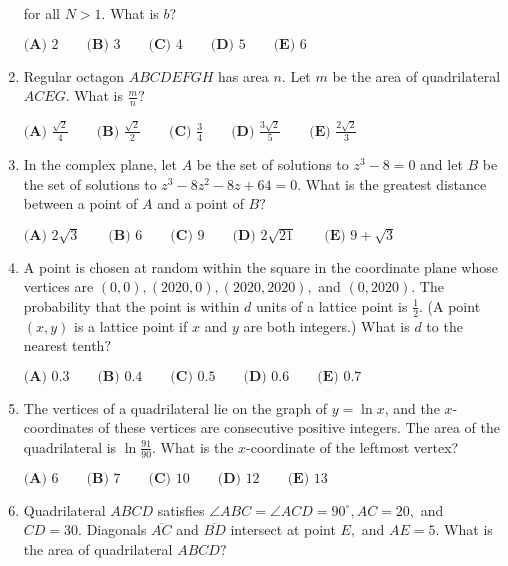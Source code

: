 \documentclass{article}%
\begin{document}
\begin{enumerate}
for all $N > 1$. What is $b$?

$\textbf{(A) } 2 \qquad \textbf{(B) } 3 \qquad \textbf{(C) } 4 \qquad \textbf{(D) } 5 \qquad \textbf{(E) } 6$

%
\item%
[\textbf{Problem 14}]Regular octagon $ABCDEFGH$ has area $n$. Let $m$ be the area of quadrilateral $ACEG$. What is $\frac{m}{n}?$

$\textbf{(A) } \frac{\sqrt{2}}{4} \qquad \textbf{(B) } \frac{\sqrt{2}}{2} \qquad \textbf{(C) } \frac{3}{4} \qquad \textbf{(D) } \frac{3\sqrt{2}}{5} \qquad \textbf{(E) } \frac{2\sqrt{2}}{3}$

%
\item%
[\textbf{Problem 15}]In the complex plane, let $A$ be the set of solutions to $z^{3}-8=0$ and let $B$ be the set of solutions to $z^{3}-8z^{2}-8z+64=0.$ What is the greatest distance between a point of $A$ and a point of $B?$

$\textbf{(A) } 2\sqrt{3} \qquad \textbf{(B) } 6 \qquad \textbf{(C) } 9 \qquad \textbf{(D) } 2\sqrt{21} \qquad \textbf{(E) } 9+\sqrt{3}$

%
\item%
[\textbf{Problem 16}]A point is chosen at random within the square in the coordinate plane whose vertices are $(0, 0), (2020, 0), (2020, 2020),$ and $(0, 2020)$. The probability that the point is within $d$ units of a lattice point is $\frac{1}{2}$. (A point $(x, y)$ is a lattice point if $x$ and $y$ are both integers.) What is $d$ to the nearest tenth$?$

$\textbf{(A) } 0.3 \qquad \textbf{(B) } 0.4 \qquad \textbf{(C) } 0.5 \qquad \textbf{(D) } 0.6 \qquad \textbf{(E) } 0.7$

%
\item%
[\textbf{Problem 17}]The vertices of a quadrilateral lie on the graph of $y=\ln{x}$, and the $x$-coordinates of these vertices are consecutive positive integers. The area of the quadrilateral is $\ln{\frac{91}{90}}$. What is the $x$-coordinate of the leftmost vertex?

$\textbf{(A) } 6 \qquad \textbf{(B) } 7 \qquad \textbf{(C) } 10 \qquad \textbf{(D) } 12 \qquad \textbf{(E) } 13$

%
\item%
[\textbf{Problem 18}]Quadrilateral $ABCD$ satisfies $\angle ABC = \angle ACD = 90^{\circ}, AC=20,$ and $CD=30.$ Diagonals $\overline{AC}$ and $\overline{BD}$ intersect at point $E,$ and $AE=5.$ What is the area of quadrilateral $ABCD?$


\end{enumerate}
\end{document}
